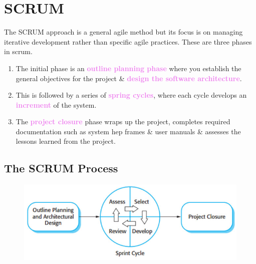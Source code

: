 \documentclass{report}
\newcommand{\textv}[1]{\textcolor{violet}{#1}}
\newcommand{\textbfv}[1]{\textbf{\textv{#1}}}
\begin{document}
\section{SCRUM}
\noindent The SCRUM approach is a general agile method but its focus is on managing iterative development rather than specific agile practices. These are three phases in scrum.
\begin{multicols}{2}
\begin{enumerate}
  \item The initial phase is an \textbfv{outline planning phase} where you establish the general objectives for the project \& \textbfv{design the software architecture}.
  \item This is followed by a series of \textbfv{spring cycles}, where each cycle develops an \textbfv{increment} of the system.
  \item The \textbfv{project closure} phase wraps up the project, completes required documentation such as system hep frames \& user manuals \& assesses the lessons learned from the project.
\end{enumerate}

\subsection{The SCRUM Process}
\begin{figure}[H]
\centering
\includegraphics[scale=.4,trim=1cm 1cm 1cm 1cm]{assets/CEN4010_Scrum_Process.jpg}
\end{figure}
\end{multicols}
\end{document}
